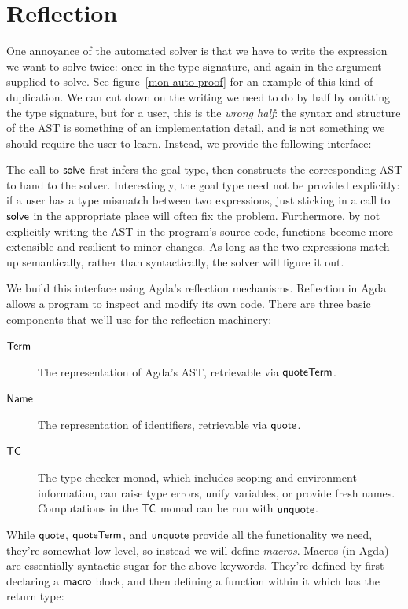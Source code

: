 \documentclass[draft, twocolumn]{article}
\theoremstyle{definition}
\theoremstyle{definition}
\begin{document}
\section{Reflection} \label{reflection}
One annoyance of the automated solver is that we have to write the expression we
want to solve twice: once in the type signature, and again in the argument
supplied to solve. See figure~\ref{mon-auto-proof} for an example of this kind
of duplication. We can cut down on the writing we need to do by half by omitting
the type signature, but for a user, this is the \emph{wrong half}: the syntax
and structure of the AST is something of an implementation detail, and is not
something we should require the user to learn. Instead, we provide the following
interface:

The call to \(\AgdaMacro{solve}\) first infers the goal type, then constructs
the corresponding AST to hand to the solver. Interestingly, the goal type need
not be provided explicitly: if a user has a type mismatch between two
expressions, just sticking in a call to \(\AgdaMacro{solve}\) in the appropriate
place will often fix the problem. Furthermore, by not explicitly writing the AST
in the program's source code, functions become more extensible and resilient to
minor changes. As long as the two expressions match up semantically, rather than
syntactically, the solver will figure it out.

We build this interface using Agda's reflection
mechanisms\cite{van_der_walt_reflection_2012}. Reflection in Agda allows a
program to inspect and modify its own code. There are three basic components
that we'll use for the reflection machinery:
\begin{description}
  \item[\(\AgdaDatatype{Term}\)] The representation of Agda's AST, retrievable
    via \(\AgdaKeyword{quoteTerm}\).
  \item[\(\AgdaDatatype{Name}\)] The representation of identifiers, retrievable
    via \(\AgdaKeyword{quote}\).
  \item[\(\AgdaDatatype{TC}\)] The type-checker monad, which includes scoping
    and environment information, can raise type errors, unify variables, or
    provide fresh names. Computations in the \(\AgdaDatatype{TC}\) monad can be
    run with \(\AgdaKeyword{unquote}\).
\end{description}

While \(\AgdaKeyword{quote}\), \(\AgdaKeyword{quoteTerm}\), and
\(\AgdaKeyword{unquote}\) provide all the functionality we need, they're
somewhat low-level, so instead we will define \emph{macros}. Macros (in Agda)
are essentially syntactic sugar for the above keywords. They're defined by first
declaring a \(\AgdaKeyword{macro}\) block, and then defining a function within
it which has the return type:
\end{document}
